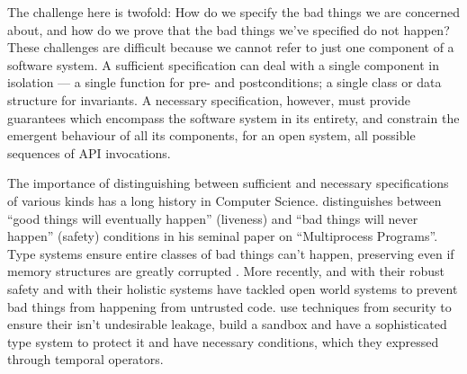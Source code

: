 
The challenge here is twofold: How do we specify the bad things we are
concerned about, and how do we prove that the bad things we've
specified do not happen?  These challenges are difficult because we
cannot refer to just one component of a software system.  A sufficient
specification can deal with a single component in isolation --- a
single function for pre- and postconditions; a single class or data
structure for invariants. A necessary specification, however, must
provide guarantees which encompass the software system in its
entirety, and constrain the emergent behaviour of all its components,
for an open system, all possible sequences of API invocations.




The importance of distinguishing between sufficient and necessary
specifications of various kinds has a long history in Computer
Science. \citeauthor{Lamport77} distinguishes between ``good things
will eventually happen'' (liveness) and ``bad things will never
happen'' (safety) conditions in his seminal paper on ``Multiprocess
Programs''.  Type systems ensure entire classes of bad things can't
happen, preserving  even if memory structures are greatly
corrupted \cite{Rinard03}.
%
More recently, \citeauthor{ddd} and \citeauthor{sandbox} with their robust safety and
\citeauthor{FASE} with their holistic systems have tackled open world systems to prevent bad things from happening from untrusted code.
\citeauthor{ddd} use techniques from security to ensure their isn't undesirable leakage, \citeauthor{sandbox} build a sandbox and have a sophisticated type system to protect it and \citeauthor{FASE} have
necessary conditions, which they expressed through temporal
operators.


